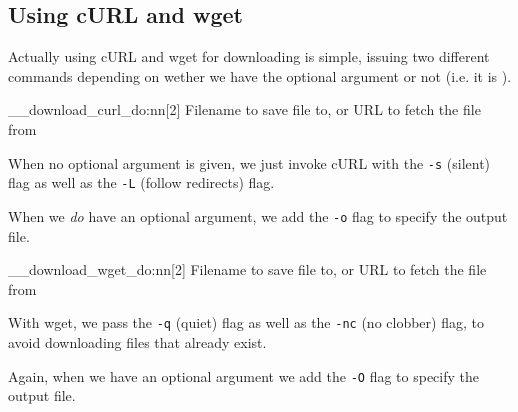 \documentclass{skdoc}
\begin{document}
    \subsection{Using cURL and wget}
    Actually using cURL and wget for downloading is simple, issuing
    two different commands depending on wether we have the optional
    argument or not (i.e. it is ).

    \begin{macro}{\__download_curl_do:nn}[2]
        {Filename to save file to, or }
        {URL to fetch the file from}
\begin{MacroCode}{package}
\cs_new:Npn\__download_curl_do:nn#1#2{
    \IfNoValueTF{#1}{
\end{MacroCode}
    When no optional argument is given, we just invoke cURL with the
    \texttt{-s} (silent) flag as well as the \texttt{-L} (follow
    redirects) flag.
\begin{MacroCode}{package}
        \immediate{}
    }{
\end{MacroCode}
    When we \emph{do} have an optional argument, we add the \texttt{-o}
    flag to specify the output file.
\begin{MacroCode}{package}
        \immediate{}
    }
}
\end{MacroCode}
    \end{macro}

    \begin{macro}{\__download_wget_do:nn}[2]
        {Filename to save file to, or }
        {URL to fetch the file from}
\begin{MacroCode}{package}
\cs_new:Npn\__download_wget_do:nn#1#2{
    \IfNoValueTF{#1}{
\end{MacroCode}
    With wget, we pass the \texttt{-q} (quiet) flag as well as the
    \texttt{-nc} (no clobber) flag, to avoid downloading files that
    already exist.
\begin{MacroCode}{package}
        \immediate{}
    }{
\end{MacroCode}
    Again, when we have an optional argument we add the \texttt{-O}
    flag to specify the output file.
\begin{MacroCode}{package}
        \immediate{}
    }
}
\end{MacroCode}
    \end{macro}
\end{document}
